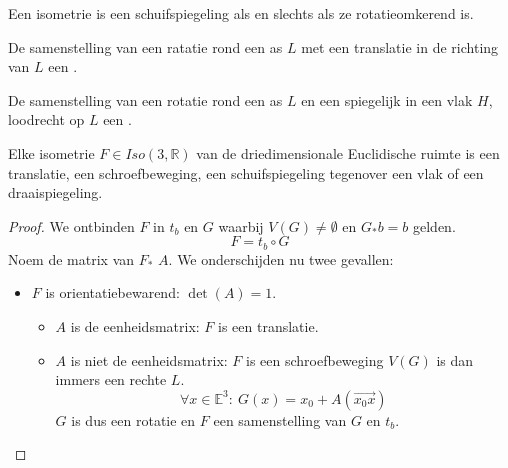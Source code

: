 \documentclass[main.tex]{subfiles}
\begin{document}
\begin{gev}
  \examen
  Een isometrie is een schuifspiegeling als en slechts als ze rotatieomkerend is.
\end{gev}

\begin{de}
  \term
  De samenstelling van een ratatie rond een as $L$ met een translatie in de richting van $L$ een .
\end{de}

\begin{de}
  De samenstelling van een rotatie rond een as $L$ en een spiegelijk in een vlak $H$, loodrecht op $L$ een .
\end{de}

\begin{st}
  \examen
  Elke isometrie $F\in Iso(3,\mathbb{R})$ van de driedimensionale Euclidische ruimte is een translatie, een schroefbeweging, een schuifspiegeling tegenover een vlak of een draaispiegeling.
  \begin{proof}
    We ontbinden $F$ in $t_{b}$ en $G$ waarbij $V(G) \neq \emptyset$ en $G_{*}b = b$ gelden.
    \[F = t_{b} \circ G\]
    Noem de matrix van $F_{*}$ $A$.
    We onderschijden nu twee gevallen:
    \begin{itemize}
    \item $F$ is orientatiebewarend: $\det(A) = 1$.
      \begin{itemize}
      \item $A$ is de eenheidsmatrix: $F$ is een translatie.
      \item $A$ is niet de eenheidsmatrix: $F$ is een schroefbeweging
        $V(G)$ is dan immers een rechte $L$.
        \[ \forall x \in \mathbb{E}^{3}:\ G(x) = x_{0} + A(\overrightarrow{x_{0}x}) \]
        $G$ is dus een rotatie en $F$ een samenstelling van $G$ en $t_{b}$.
      \end{itemize}


\end{itemize}
\end{proof}
\end{st}
\end{document}
